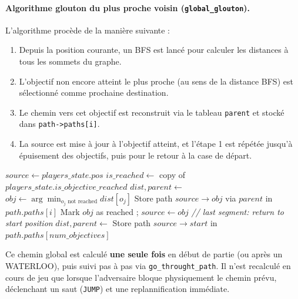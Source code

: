 \documentclass[12pt,a4paper]{article}
\begin{document}
\paragraph{Algorithme glouton du plus proche voisin (\texttt{global\_glouton}).}
L'algorithme procède de la manière suivante :

\begin{enumerate}
    \item Depuis la position courante, un BFS est lancé pour calculer les 
    distances à tous les sommets du graphe.
    \item L'objectif non encore atteint le plus proche (au sens de la distance 
    BFS) est sélectionné comme prochaine destination.
    \item Le chemin vers cet objectif est reconstruit via le tableau 
    \texttt{parent} et stocké dans \texttt{path->paths[i]}.
    \item La source est mise à jour à l'objectif atteint, et l'étape 1 est 
    répétée jusqu'à épuisement des objectifs, puis pour le retour à la case 
    de départ.
\end{enumerate}

\begin{algorithm}
\caption{Global greedy path computation (tourist)}
\begin{algorithmic}[1]
    \State $source \gets players\_state.pos$
    \State $is\_reached \gets$ copy of $players\_state.is\_objective\_reached$
        \State $dist, parent \gets$ 
        \State $obj \gets \arg\min_{o_j \text{ not reached}} dist[o_j]$
        \State Store path $source \to obj$ via $parent$ in $path.paths[i]$
        \State Mark $obj$ as reached ; $source \gets obj$
    \EndFor
    \State \textit{// last segment: return to start position}
    \State $dist, parent \gets$ 
    \State Store path $source \to start$ in $path.paths[num\_objectives]$
\EndFunction
\end{algorithmic}
\end{algorithm}

\noindent Ce chemin global est calculé \textbf{une seule fois} en début de 
partie (ou après un WATERLOO), puis suivi pas à pas via \texttt{go\_throught\_path}.
Il n'est recalculé en cours de jeu que lorsque l'adversaire bloque physiquement 
le chemin prévu, déclenchant un saut (\texttt{JUMP}) et une replannification immédiate.
\end{document}
